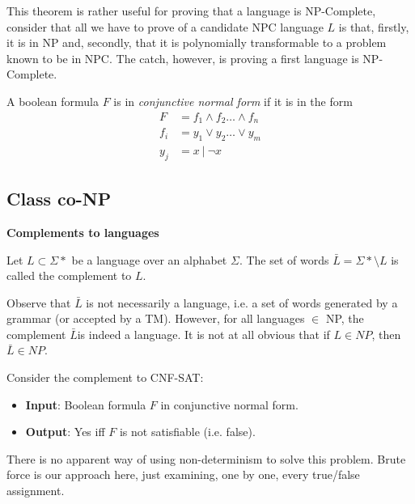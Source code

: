 This theorem is rather useful for proving that a language is NP-Complete,
consider that all we have to prove of a candidate NPC language $L$ is that, firstly,
it is in NP and, secondly, that it is polynomially transformable to a problem known to be in NPC.
The catch, however, is proving a first language is NP-Complete.

\begin{definition}
    A boolean formula $F$ is in \textit{conjunctive normal form} if it is in the form
    \begin{equation}
        \begin{split}
            F &= f_1 \land f_2 \dots \land f_n \\
            f_i &= y_1 \lor y_2 \dots \lor y_m \\
            y_j &= x\ |\ \neg x
        \end{split}
    \end{equation}
\end{definition}

\subsection{Class co-NP}
\textbf{Complements to languages}
\begin{definition}
    Let $L \subset \Sigma\ast$ be a language over an alphabet $\Sigma$.
    The set of words $\bar{L} = \Sigma\ast \setminus L$ is called the complement to $L$.
\end{definition}

Observe that $\bar{L}$ is not necessarily a language,
i.e. a set of words generated by a grammar (or accepted by a TM).
However, for all languages $\in$ NP, the complement $\bar{L}$is indeed a language.
It is not at all obvious that if $L \in NP$, then $\bar{L} \in NP$.

\begin{example}
    Consider the complement to CNF-SAT:
    \begin{itemize}
        \item \textbf{Input}: Boolean formula $F$ in conjunctive normal form.
        \item \textbf{Output}: Yes iff $F$ is not satisfiable (i.e. false).
    \end{itemize}
    There is no apparent way of using non-determinism to solve this problem.
    Brute force is our approach here, just examining, one by one, every true/false assignment.
\end{example}


